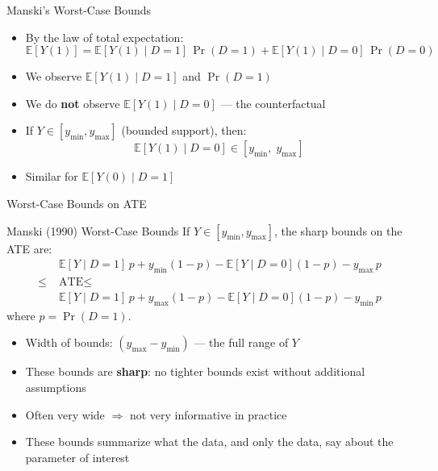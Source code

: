 \documentclass[10pt]{beamer}
\newcommand{\E}{\mathbb{E}}
\begin{document}
\begin{frame}{Manski's Worst-Case Bounds}
  \begin{itemize}
    \item By the law of total expectation:
      $$
        \E[Y(1)] = \E[Y(1) \mid D=1]\, \Pr(D=1) + \E[Y(1) \mid D=0]\, \Pr(D=0)
      $$
    \item We observe $\E[Y(1) \mid D=1]$ and $\Pr(D=1)$
    \item We do \textbf{not} observe $\E[Y(1) \mid D=0]$ --- the counterfactual
    \item If $Y \in [y_{\min}, y_{\max}]$ (bounded support), then:
      $$
        \E[Y(1) \mid D=0] \in [y_{\min},\; y_{\max}]
      $$
    \item Similar for $\E[Y(0) \mid D = 1]$
  \end{itemize}
\end{frame}

\begin{frame}{Worst-Case Bounds on ATE}
  \begin{block}{Manski (1990) Worst-Case Bounds}
    If $Y \in [y_{\min}, y_{\max}]$, the sharp bounds on the ATE are:
    \begin{align*}
      &\E[Y \mid D=1]\,p + y_{\min}(1-p) - \E[Y \mid D=0](1-p) - y_{\max}\, p \\
      \leq\; &\text{ATE} \leq \\
      &\E[Y \mid D=1]\,p + y_{\max}(1-p) - \E[Y \mid D=0](1-p) - y_{\min}\, p
    \end{align*}
    where $p = \Pr(D=1)$.
  \end{block}
  \begin{itemize}
    \item Width of bounds: $(y_{\max} - y_{\min})$ --- the full range of $Y$
    \item These bounds are \textbf{sharp}: no tighter bounds exist without additional assumptions
    \item Often very wide $\Rightarrow$ not very informative in practice
    \item These bounds summarize what the data, and only the data, say about the parameter of interest
  \end{itemize}
\end{frame}
\end{document}
